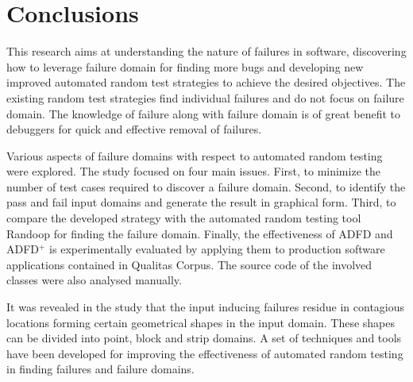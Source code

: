 
\chapter{Conclusions}
\label{chap:conclusions_8}



This research aims at understanding the nature of failures in software, discovering how to leverage failure domain for finding more bugs and developing new improved automated random test strategies to achieve the desired objectives. The existing random test strategies find individual failures and do not focus on failure domain. The knowledge of failure along with failure domain is of great benefit to debuggers for quick and effective removal of failures.

Various aspects of failure domains with respect to automated random testing were explored. The study focused on four main issues. First, to minimize the number of test cases required to discover a failure domain. Second, to identify the pass and fail input domains and generate the result in graphical form. Third, to compare the developed strategy with the automated random testing tool Randoop for finding the failure domain. Finally, the effectiveness of ADFD and ADFD$^+$ is experimentally evaluated by applying them to production software applications contained in Qualitas Corpus. The source code of the involved classes were also analysed manually.
 
It was revealed in the study that the input inducing failures residue in contagious locations forming certain geometrical shapes in the input domain. These shapes can be divided into point, block and strip domains. A set of techniques and tools have been developed for improving the effectiveness of automated random testing in finding failures and failure domains. 






